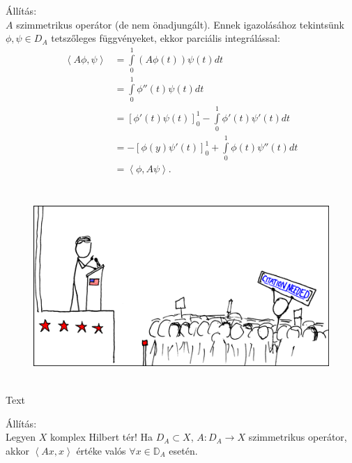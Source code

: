 \documentclass[12pt,a4paper]{scrartcl}
\newenvironment{allitas}{}{}
\newenvironment{ajanlofig}{\begin{figure}\begin{center}}{
\end{center}\end{figure}}
\begin{document}
\begin{allitas}

Állítás:\\
\(A\) szimmetrikus operátor (de nem önadjungált). Ennek igazolásához
tekintsünk \(\phi,\psi \in D_{A}\) tetszőleges függvényeket, ekkor
parciális integrálással: \[\begin{aligned}
  \left\langle {A\phi ,\psi } \right\rangle  &  = \int\limits_0^1 {\left( {A\phi \left( t \right)} \right)\psi \left( t \right)dt}  \\ 
   &  = \int\limits_0^1 {\phi ''\left( t \right)\psi \left( t \right)dt}  \\ 
   &  = \left[ {\phi '\left( t \right)\psi \left( t \right)} \right]_0^1 - \int\limits_0^1 {\phi '\left( t \right)\psi '\left( t \right)dt}  \\ 
   &  =  - \left[ {\phi \left( y \right)\psi '\left( t \right)} \right]_0^1 + \int\limits_0^1 {\phi \left( t \right)\psi ''\left( t \right)dt}  \\ 
   &  = \left\langle {\phi ,A\psi } \right\rangle . \\ 
\end{aligned} \]

\end{allitas}

\begin{ajanlo}

\begin{ajanlofig}

\href{https://xkcd.com}{\includegraphics[width=5.20833in,height=2.82292in]{wikipedian_protester.png}}

\end{ajanlofig}

Text

\end{ajanlo}

\begin{allitas}

Állítás:\\
Legyen \(X\) komplex Hilbert tér! Ha \(D_{A} \subset X\),
\(\left. A:D_{A}\rightarrow X \right.\) szimmetrikus operátor, akkor
\(\left\langle {Ax,x} \right\rangle\) értéke valós
\(\forall x \in {\mathbb{D}}_{A}\) esetén.

\end{allitas}
\end{document}
